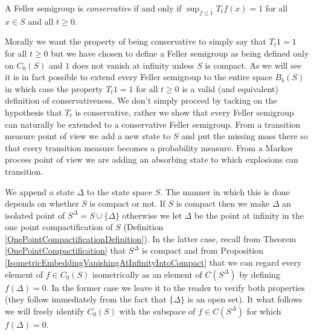 \begin{defn}A Feller semigroup is \emph{conservative} if and only if $\sup_{f \leq 1} T_t f(x) = 1$ for all $x \in S$ and all $t \geq 0$.
\end{defn}
Morally we want the property of being conservative to simply say that $T_t 1 = 1$ for all $t \geq 0$ but we have chosen to define a Feller semigroup as being defined only on $C_0(S)$ and $1$ does not vanish at infinity unless $S$ is compact.  As we will see it is in fact possible to extend every Feller semigroup to the entire space $B_b(S)$ in which case the property $T_t 1 = 1$ for all $t \geq 0$ is a valid (and equivalent) definition of conservativeness.  We don't simply proceed by tacking on the hypothesis that $T_t$ is conservative, rather we show that every Feller semigroup can naturally be extended to a conservative Feller semigroup.  From a transition measure point of view we add a new state to $S$ and put the missing mass there so that every transition measure becomes a probability measure.  From a Markov process point of view we are adding an absorbing state to which explosions can transition.

We append a state $\Delta$ to the state space $S$.  The manner in which this is done depends on whether $S$ is compact or not.  If $S$ is compact then we
make $\Delta$ an isolated point of $S^{\Delta} = S \cup \lbrace \Delta \rbrace$ otherwise we let $\Delta$ be the point at infinity in the one point compactification of $S$ (Definition \ref{OnePointCompactificationDefinition}).  In the latter case, recall from Theorem \ref{OnePointCompactification} that $S^\Delta$ is compact and from Proposition \ref{IsometricEmbeddingVanishingAtInfinityIntoCompact} that we can regard every element of $f \in C_0(S)$ isometrically as an element of $C(S^\Delta)$ by defining $f(\Delta) = 0$.  In the former case we leave it to the reader to verify both properties (they follow immediately from the fact that $\lbrace \Delta \rbrace$ is an open set).  It what follows we will freely identify $C_0(S)$ with the subspace of $f \in C(S^\Delta)$ for which $f(\Delta) = 0$.

